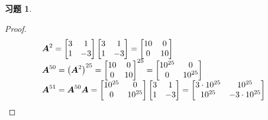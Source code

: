 \documentclass{ctexart}
\newtheorem{problem}{习题}[section]
\begin{document}
\begin{problem}
\end{problem}
\begin{proof}
    \begin{equation*}
        \begin{array}{lll}
            \boldsymbol{A}^2=\begin{bmatrix}3&1\\1&-3\end{bmatrix}\begin{bmatrix}3&1\\1&-3\end{bmatrix}=\begin{bmatrix}10&0\\0&10\end{bmatrix}      \\
            \boldsymbol{A}^{50}=\left( \boldsymbol{A}^2 \right)^{25}={\begin{bmatrix}10&0\\0&10\end{bmatrix}}^{25}=\begin{bmatrix}10^{25}&0\\0&10^{25}\end{bmatrix} \\
            \boldsymbol{A}^{51}=\boldsymbol{A}^{50}\boldsymbol{A}=\begin{bmatrix}10^{25}&0\\0&10^{25}\end{bmatrix}\begin{bmatrix}3&1\\1&-3\end{bmatrix}=\begin{bmatrix}3\cdot10^{25}&10^{25}\\10^{25}&-3\cdot10^{25}\end{bmatrix}
        \end{array}
    \end{equation*}
\end{proof}
\end{document}

